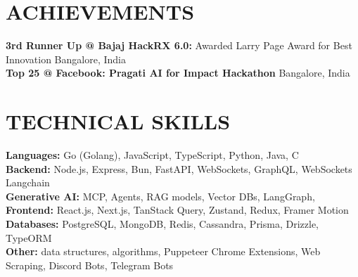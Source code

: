 \documentclass[letterpaper,11pt]{article}
\begin{document}
\section{ACHIEVEMENTS}
\begin{itemize}[leftmargin=0.15in, label={}]
	\small{\item{
		{\textbf{3rd Runner Up @ Bajaj HackRX 6.0:} Awarded Larry Page Award for Best Innovation \hfill Bangalore, India \\
			{\textbf{Top 25 @ Facebook: Pragati AI for Impact Hackathon}} \hfill Bangalore, India \\
		}} 
	}
\end{itemize}


\section{TECHNICAL SKILLS}
\begin{itemize}[leftmargin=0.15in, label={}]
	\small{\item{
		\textbf{Languages:} Go (Golang), JavaScript, TypeScript, Python, Java, C \\
		\textbf{Backend:} Node.js, Express, Bun, FastAPI, WebSockets, GraphQL, WebSockets Langchain \\
		\textbf{Generative AI:} MCP, Agents, RAG models, Vector DBs, LangGraph,\\
		\textbf{Frontend:} React.js, Next.js, TanStack Query, Zustand, Redux, Framer Motion \\
		\textbf{Databases:} PostgreSQL, MongoDB, Redis, Cassandra, Prisma, Drizzle, TypeORM \\
		\textbf{Other:} data structures, algorithms, Puppeteer Chrome Extensions, Web Scraping, Discord Bots, Telegram Bots \\
	}}
\end{itemize}
\end{document}
